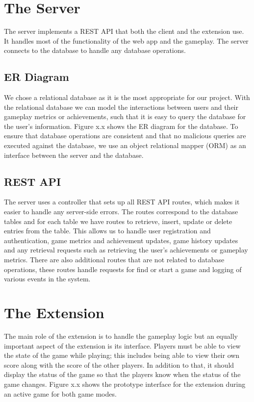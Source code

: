 \documentclass{l4proj}
\begin{document}
\section{The Server}
The server implements a REST API that both the client and the extension use. It handles most of the functionality of the web app and the gameplay. The server connects to the database to handle any database operations. 

\subsection{ER Diagram}
We chose a relational database as it is the most appropriate for our project. With the relational database we can model the interactions between users and their gameplay metrics or achievements, such that it is easy to query the database for the user's information. Figure x.x shows the ER diagram for the database. To ensure that database operations are consistent and that no malicious queries are executed against the database, we use an object relational mapper (ORM) as an interface between the server and the database.

\subsection{REST API}
The server uses a controller that sets up all REST API routes, which makes it easier to handle any server-side errors. The routes correspond to the database tables and for each table we have routes to retrieve, insert, update or delete entries from the table. This allows us to handle user registration and authentication, game metrics and achievement updates, game history updates and any retrieval requests such as retrieving the user's achievements or gameplay metrics. There are also additional routes that are not related to database operations, these routes handle requests for find or start a game and logging of various events in the system.

\section{The Extension}
The main role of the extension is to handle the gameplay logic but an equally important aspect of the extension is its interface. Players must be able to view the state of the game while playing; this includes being able to view their own score along with the score of the other players. In addition to that, it should display the status of the game so that the players know when the status of the game changes. Figure x.x shows the prototype interface for the extension during an active game for both game modes.
\end{document}
